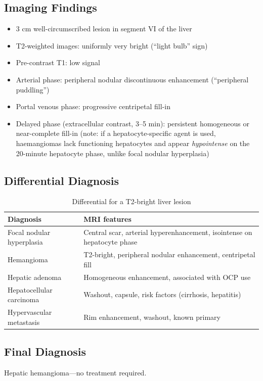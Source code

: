 \subsection{Imaging Findings}
\begin{itemize}
    \item 3 cm well-circumscribed lesion in segment VI of the liver
    \item T2-weighted images: uniformly very bright (``light bulb'' sign)
    \item Pre-contrast T1: low signal
    \item Arterial phase: peripheral nodular discontinuous enhancement (``peripheral puddling'')
    \item Portal venous phase: progressive centripetal fill-in
    \item Delayed phase (extracellular contrast, 3--5 min): persistent homogeneous or near-complete fill-in (note: if a hepatocyte-specific agent is used, haemangiomas lack functioning hepatocytes and appear \emph{hypointense} on the 20-minute hepatocyte phase, unlike focal nodular hyperplasia)
\end{itemize}

\subsection{Differential Diagnosis}
\begin{table}[h]
\centering
\caption{Differential for a T2-bright liver lesion}
\begin{tabular}{|p{}|p{}|}
\hline
\textbf{Diagnosis} & \textbf{MRI features} \\
\hline
Focal nodular hyperplasia & Central scar, arterial hyperenhancement, isointense on hepatocyte phase \\
\hline
Hemangioma & T2-bright, peripheral nodular enhancement, centripetal fill \\
\hline
Hepatic adenoma & Homogeneous enhancement, associated with OCP use \\
\hline
Hepatocellular carcinoma & Washout, capsule, risk factors (cirrhosis, hepatitis) \\
\hline
Hypervascular metastasis & Rim enhancement, washout, known primary \\
\hline
\end{tabular}
\end{table}

\subsection{Final Diagnosis}
Hepatic hemangioma---no treatment required.

